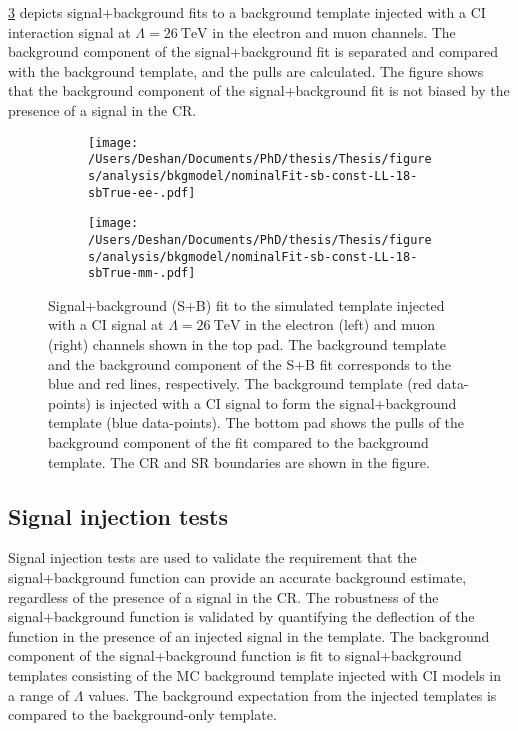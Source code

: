 \cref{fig:bkgmodel:sbfits} depicts signal+background fits to a background template injected with a CI interaction signal at $\Lambda = \SI{26}{\tera\electronvolt}$ in the electron and muon channels. The background component of the signal+background fit is separated and compared with the background template, and the pulls are calculated. The figure shows that the background component of the signal+background fit is not biased by the presence of a signal in the CR. 
\begin{figure}[h!]
    \centering
    \begin{subfigure}[b]{0.49\textwidth}
        \centering
        \texttt{[image: /Users/Deshan/Documents/PhD/thesis/Thesis/figures/analysis/bkgmodel/nominalFit-sb-const-LL-18-sbTrue-ee-.pdf]}
        \label{fig:bkgmodel:sbfits1}
    \end{subfigure}
    \begin{subfigure}[b]{0.49\textwidth}
        \centering
        \texttt{[image: /Users/Deshan/Documents/PhD/thesis/Thesis/figures/analysis/bkgmodel/nominalFit-sb-const-LL-18-sbTrue-mm-.pdf]}
        \label{fig:bkgmodel:sbfits2}
    \end{subfigure}
    \caption[Signal+Background fits to the signal+background template in the electron and muon channels]{Signal+background (S+B) fit to the simulated template injected with a CI signal at $\Lambda = \SI{26}{\tera\electronvolt}$ in the electron (left) and muon (right) channels shown in the top pad. The background template and the background component of the S+B fit corresponds to the blue and red lines, respectively. The background template (red data-points) is injected with a CI signal to form the signal+background template (blue data-points). The bottom pad shows the pulls of the background component of the fit compared to the background template. The CR and SR boundaries are shown in the figure.}
    \label{fig:bkgmodel:sbfits}
\end{figure}

\subsection{Signal injection tests}\label{sec:extrap:recovery}
Signal injection tests are used to validate the requirement that the signal+background function can provide an accurate background estimate, regardless of the presence of a signal in the CR. The robustness of the signal+background function is validated by quantifying the deflection of the function in the presence of an injected signal in the template. The background component of the signal+background function is fit to signal+background templates consisting of the MC background template injected with CI models in a range of $\Lambda$ values. The background expectation from the injected templates is compared to the background-only template.  


